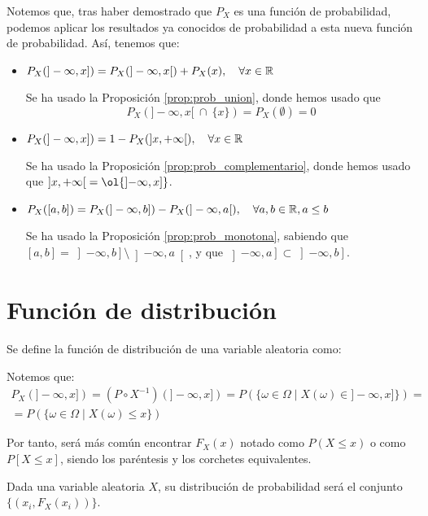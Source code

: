 Notemos que, tras haber demostrado que $P_X$ es una función de probabilidad,
podemos aplicar los resultados ya conocidos de probabilidad a esta nueva función de probabilidad. Así, tenemos que:
\begin{itemize}
    \item $P_X(]-\infty, x]) = P_X(]-\infty, x[) + P_X(x), \quad \forall x \in \mathbb R$
    
    Se ha usado la Proposición \ref{prop:prob_union}, donde hemos usado que $$P_X(]-\infty, x[~\cap ~\{x\}) = P_X(\emptyset) = 0$$

    \item $P_X(]-\infty, x]) = 1 - P_X(]x, +\infty[), \quad \forall x \in \mathbb R$
    
    Se ha usado la Proposición \ref{prop:prob_complementario}, donde hemos usado que $\left]x, +\infty\right[ = \ol{\left]-\infty, x\right]}$.

    \item $P_X([a,b]) = P_X(]-\infty, b]) - P_X(]-\infty, a[), \quad \forall a,b \in \mathbb R, a \leq b$
    
    Se ha usado la Proposición \ref{prop:prob_monotona}, sabiendo que $[a,b] = \left]-\infty, b\right] \setminus \left]-\infty, a\right[$, y que $\left]-\infty, a\right]\subset \left]-\infty, b\right]$.
    
\end{itemize}

\section{Función de distribución}
\begin{definicion}
Se define la función de distribución de una variable aleatoria como:
\Func{F_X}{\R}{[0,1]}{x}{P_X\left(]-\infty, x]\right)}
\end{definicion}
\begin{notacion}
Notemos que:
\begin{multline*}
    P_X(]-\infty, x]) = (P \circ X^{-1})(]-\infty, x]) = P(\{\omega \in \Omega \mid X(\omega) \in ]-\infty, x] \}) =\\
    =P(\{\omega \in \Omega \mid X(\omega) \leq x\})
\end{multline*}

Por tanto, será más común encontrar $F_X(x)$ notado como $P(X \leq x)$ o como $P[X \leq x]$, siendo los paréntesis y los corchetes equivalentes.
\end{notacion}

\begin{definicion}
    Dada una variable aleatoria $X$, su distribución de probabilidad será el conjunto $\{(x_i, F_X(x_i))\}$.
\end{definicion}

